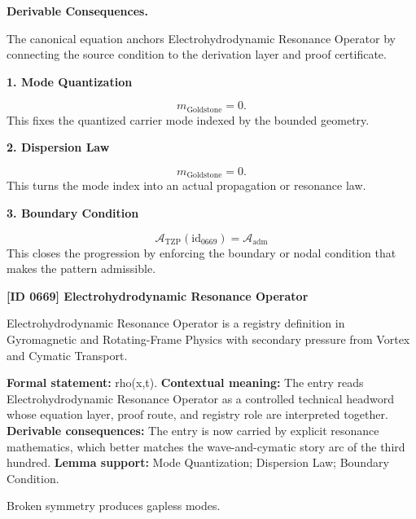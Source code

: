 \par\vspace{0.35em}
\noindent\textbf{Derivable Consequences.}\quad
\begingroup
\footnotesize
\raggedright
The canonical equation anchors Electrohydrodynamic Resonance Operator by connecting the source condition to the derivation layer and proof certificate.
\par\endgroup

\noindent\textbf{1. Mode Quantization}\par
\[
m_{\mathrm{Goldstone}} = 0.
\]
\noindent This fixes the quantized carrier mode indexed by the bounded geometry.\par
\noindent\textbf{2. Dispersion Law}\par
\[
\boxed{ m_{\mathrm{Goldstone}} = 0. }
\]
\noindent This turns the mode index into an actual propagation or resonance law.\par
\noindent\textbf{3. Boundary Condition}\par
\[
\mathcal{A}_{\mathrm{TZP}}(\mathrm{id}_{0669})=\mathcal{A}_{\mathrm{adm}}
\]
\noindent This closes the progression by enforcing the boundary or nodal condition that makes the pattern admissible.\par

\clearpage
\noindent\textbf{[ID 0669] Electrohydrodynamic Resonance Operator}\par
\vspace{0.35em}
\begingroup\small
{}
Electrohydrodynamic Resonance Operator is a registry definition in Gyromagnetic and Rotating-Frame Physics with secondary pressure from Vortex and Cymatic Transport.

\begingroup\footnotesize\setlength{\emergencystretch}{3em}\sloppy
\textbf{Formal statement:} rho(x,t). \textbf{Contextual meaning:} The entry reads Electrohydrodynamic Resonance Operator as a controlled technical headword whose equation layer, proof route, and registry role are interpreted together. \textbf{Derivable consequences:} The entry is now carried by explicit resonance mathematics, which better matches the wave-and-cymatic story arc of the third hundred. \textbf{Lemma support:} Mode Quantization; Dispersion Law; Boundary Condition.\par
\endgroup

Broken symmetry produces gapless modes.

